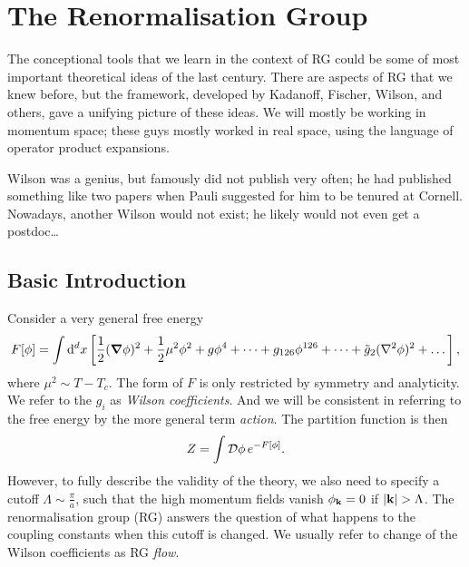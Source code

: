 \chapter{The Renormalisation Group}%
\label{cha:the_renormalisation_group}

The conceptional tools that we learn in the context of RG could be some of most important theoretical ideas of the last century. There are aspects of RG that we knew before, but the framework, developed by Kadanoff, Fischer, Wilson, and others, gave a unifying picture of these ideas.
We will mostly be working in momentum space; these guys mostly worked in real space, using the language of operator product expansions.

\begin{leftbar}
  \begin{remark}
    Wilson was a genius, but famously did not publish very often; he had published something like two papers when Pauli suggested for him to be tenured at Cornell. Nowadays, another Wilson would not exist; he likely would not even get a postdoc\dots
  \end{remark}
\end{leftbar}

\section{Basic Introduction}%
\label{sec:basic_introduction}

Consider a very general free energy
\begin{equation}
  \label{eq:general-action}
  F[\phi] = \int \dd[d]{x} \left[ \frac{1}{2} (\grad \phi)^2 +  \frac{1}{2}\mu^2 \phi^2 + g\phi^4 + \dots + g_{126} \phi^{126} + \dots + \tilde g_{2} (\laplacian \phi)^2 + \dots \right],
\end{equation}
where $\mu^2 \sim T - T_c$. The form of $F$ is only restricted by symmetry and analyticity.
We refer to the $g_i$ as \emph{Wilson coefficients}.
And we will be consistent in referring to the free energy by the more general term \emph{action}.
The partition function is then
\begin{equation}
  Z = \int \mathop{\mathcal{D} \phi} e^{-F[\phi]}.
\end{equation}
However, to fully describe the validity of the theory, we also need to specify a cutoff $\Lambda \sim \frac{\pi}{a}$, such that the high momentum fields vanish $\phi_{\vb{k}} = 0$ if $\abs{\vb{k}} > \Lambda$. 
The renormalisation group (RG) answers the question of what happens to the coupling constants when this cutoff is changed.
We usually refer to change of the Wilson coefficients as RG \emph{flow}.

